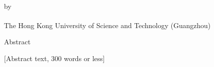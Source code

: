 \begin{center}
{\fontsize{12}{14}\selectfont \bfseries \myTitle} 
\\
\vspace{3\baselineskip}
{\fontsize{12}{14} by \textbf{\selectfont \myName}}
\vspace{2\baselineskip}
\\ 
\vspace{2\baselineskip}
\\ \selectfont The Hong Kong University of Science and Technology (Guangzhou)

\vspace{3\baselineskip}

\begin{center}
Abstract
\end{center}

\begin{center}
[Abstract text, 300 words or less]
\end{center}
\end{center}